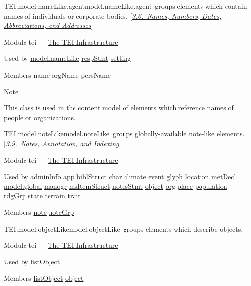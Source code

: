 \begin{reflist}
\item[]\begin{specHead}{TEI.model.nameLike.agent}{model.nameLike.agent} groups elements which contain names of individuals or corporate bodies. [\textit{\hyperref[CONA]{3.6.\ Names, Numbers, Dates, Abbreviations, and Addresses}}]\end{specHead} 
    \item[{Module}]
  tei — \hyperref[ST]{The TEI Infrastructure}
    \item[{Used by}]
  \hyperref[TEI.model.nameLike]{model.nameLike} \hyperref[TEI.respStmt]{respStmt} \hyperref[TEI.setting]{setting}
    \item[{Members}]
  \hyperref[TEI.name]{name} \hyperref[TEI.orgName]{orgName} \hyperref[TEI.persName]{persName}
    \item[{Note}]
  \par
This class is used in the content model of elements which reference names of people or organizations.
\end{reflist}  
\begin{reflist}
\item[]\begin{specHead}{TEI.model.noteLike}{model.noteLike} groups globally-available note-like elements. [\textit{\hyperref[CONO]{3.9.\ Notes, Annotation, and Indexing}}]\end{specHead} 
    \item[{Module}]
  tei — \hyperref[ST]{The TEI Infrastructure}
    \item[{Used by}]
  \hyperref[TEI.adminInfo]{adminInfo} \hyperref[TEI.app]{app} \hyperref[TEI.biblStruct]{biblStruct} \hyperref[TEI.char]{char} \hyperref[TEI.climate]{climate} \hyperref[TEI.event]{event} \hyperref[TEI.glyph]{glyph} \hyperref[TEI.location]{location} \hyperref[TEI.metDecl]{metDecl} \hyperref[TEI.model.global]{model.global} \hyperref[TEI.monogr]{monogr} \hyperref[TEI.msItemStruct]{msItemStruct} \hyperref[TEI.notesStmt]{notesStmt} \hyperref[TEI.object]{object} \hyperref[TEI.org]{org} \hyperref[TEI.place]{place} \hyperref[TEI.population]{population} \hyperref[TEI.rdgGrp]{rdgGrp} \hyperref[TEI.state]{state} \hyperref[TEI.terrain]{terrain} \hyperref[TEI.trait]{trait}
    \item[{Members}]
  \hyperref[TEI.note]{note} \hyperref[TEI.noteGrp]{noteGrp}
\end{reflist}  
\begin{reflist}
\item[]\begin{specHead}{TEI.model.objectLike}{model.objectLike} groups elements which describe objects.\end{specHead} 
    \item[{Module}]
  tei — \hyperref[ST]{The TEI Infrastructure}
    \item[{Used by}]
  \hyperref[TEI.listObject]{listObject}
    \item[{Members}]
  \hyperref[TEI.listObject]{listObject} \hyperref[TEI.object]{object}
\end{reflist}  
